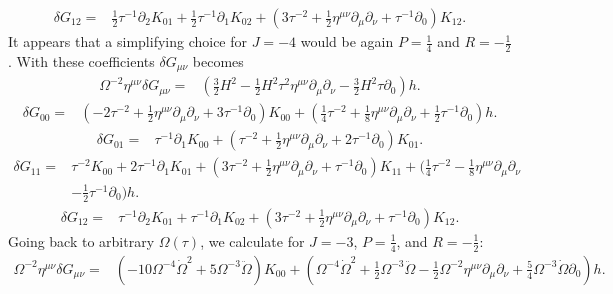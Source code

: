 \documentclass[10pt,letterpaper]{article}
\begin{document}
\begin{align}
\delta G_{12}={}&\tfrac{1}{2} \tau^{-1} \partial_{2} K_{01}
 + \tfrac{1}{2} \tau^{-1} \partial_{1} K_{02}
 + (3 \tau^{-2}
 + \tfrac{1}{2} \eta^{\mu \nu} \partial_{\mu} \partial_{\nu}
 + \tau^{-1} \partial_{0}) K_{12}.
\end{align}
It appears that a simplifying choice for $J=-4$ would be again $P=\tfrac14$ and $R=-\tfrac12$. 
With these coefficients $\delta G_{\mu\nu}$ becomes
\begin{align}
\Omega^{-2}\eta^{\mu\nu}\delta G_{\mu\nu}={}&(\tfrac{3}{2} H^2
 -  \tfrac{1}{2} H^2 \tau^2 \eta^{\mu \nu} \partial_{\mu} \partial_{\nu}
 -  \tfrac{3}{2} H^2 \tau \partial_{0}) h.
\end{align}
\begin{align}
\delta G_{00}={}&(-2 \tau^{-2}
 + \tfrac{1}{2} \eta^{\mu \nu} \partial_{\mu} \partial_{\nu}
 + 3 \tau^{-1} \partial_{0}) K_{00}
 + (\tfrac{1}{4} \tau^{-2}
 + \tfrac{1}{8} \eta^{\mu \nu} \partial_{\mu} \partial_{\nu}
 + \tfrac{1}{2} \tau^{-1} \partial_{0}) h.
\end{align}
\begin{align}
\delta G_{01}={}&\tau^{-1} \partial_{1} K_{00}
 + (\tau^{-2}
 + \tfrac{1}{2} \eta^{\mu \nu} \partial_{\mu} \partial_{\nu}
 + 2 \tau^{-1} \partial_{0}) K_{01}.
\end{align}
\begin{align}
\delta G_{11}={}&\tau^{-2} K_{00}
 + 2 \tau^{-1} \partial_{1} K_{01}
 + (3 \tau^{-2}
 + \tfrac{1}{2} \eta^{\mu \nu} \partial_{\mu} \partial_{\nu}
 + \tau^{-1} \partial_{0}) K_{11}
 + (\tfrac{1}{4} \tau^{-2}
 -  \tfrac{1}{8} \eta^{\mu \nu} \partial_{\mu} \partial_{\nu}\nonumber\\
& -  \tfrac{1}{2} \tau^{-1} \partial_{0}) h.
\end{align}
\begin{align}
\delta G_{12}={}&\tau^{-1} \partial_{2} K_{01}
 + \tau^{-1} \partial_{1} K_{02}
 + (3 \tau^{-2}
 + \tfrac{1}{2} \eta^{\mu \nu} \partial_{\mu} \partial_{\nu}
 + \tau^{-1} \partial_{0}) K_{12}.
\end{align}
Going back to arbitrary $\Omega(\tau)$, we calculate for $J=-3$, $P=\tfrac14$, and $R=-\tfrac12$:
\begin{align}
\Omega^{-2}\eta^{\mu\nu}\delta G_{\mu\nu}={}&(-10 \Omega^{-4} \dot{\Omega}^2
 + 5 \Omega^{-3} \ddot{\Omega}) K_{00}
 + (\Omega^{-4} \dot{\Omega}^2
 + \tfrac{1}{2} \Omega^{-3} \ddot{\Omega}
 -  \tfrac{1}{2} \Omega^{-2} \eta^{\mu \nu} \partial_{\mu} \partial_{\nu}
 + \tfrac{5}{4} \Omega^{-3} \dot{\Omega} \partial_{0}) h.
\end{align}
\end{document}
